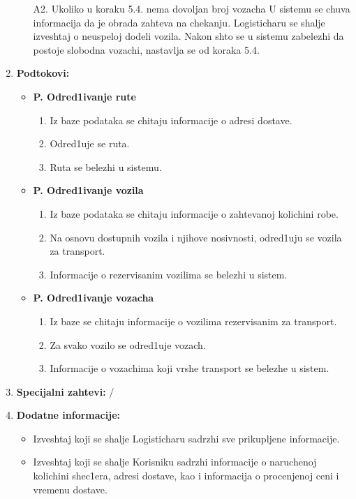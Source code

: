\begin{enumerate}
\begin{itemize}
            \item [A2.] Ukoliko u koraku 5.4. nema dovoljan broj vozacha 
            U sistemu se chuva informacija da je obrada zahteva na chekanju. Logisticharu se shalje izveshtaj o neuspeloj dodeli vozila. Nakon shto se u sistemu zabelezhi da postoje slobodna vozachi, nastavlja se od koraka 5.4.
            
            \end{itemize}
        
    \item \textbf{Podtokovi:} 
            \begin{itemize}
                \item \textbf{P. Odred1ivanje rute}
                \begin{enumerate}
                    \item Iz baze podataka se chitaju informacije o adresi dostave.
                    \item Odred1uje se ruta.
                    \item Ruta se belezhi u sistemu.
                \end{enumerate}
                
                \item \textbf{P. Odred1ivanje vozila}
                \begin{enumerate}
                    \item Iz baze podataka se chitaju informacije o zahtevanoj kolichini robe.
                    \item Na osnovu dostupnih vozila i njihove nosivnosti, odred1uju se vozila za transport.
                    \item Informacije o rezervisanim vozilima se belezhi u sistem.
                \end{enumerate}
                
                \item \textbf{P. Odred1ivanje vozacha}
                \begin{enumerate}
                    \item Iz baze se chitaju informacije o vozilima rezervisanim za transport.
                    \item Za svako vozilo se odred1uje vozach.
                    \item Informacije o vozachima koji vrshe transport se belezhe u sistem.
                \end{enumerate}
            \end{itemize}
    \item \textbf{Specijalni zahtevi:} /
    \item \textbf{Dodatne informacije:} 
            \begin{itemize}
                \item Izveshtaj koji se shalje Logisticharu sadrzhi sve prikupljene informacije. 
                \item Izveshtaj koji se shalje Korisniku sadrzhi informacije o naruchenoj kolichini shec1era, adresi dostave, kao i informacija o procenjenoj ceni i vremenu dostave.
                

\end{itemize}
\end{enumerate}
